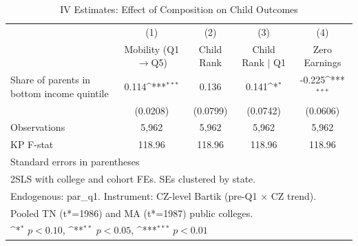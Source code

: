 \begin{table}[htbp]\centering
\def\sym#1{\ifmmode^{#1}\else\(^{#1}\)\fi}
\caption{IV Estimates: Effect of Composition on Child Outcomes}
\label{tab:iv_second_stage}
\begin{tabular}{l*{4}{c}}
\toprule
                    &\multicolumn{1}{c}{(1)}&\multicolumn{1}{c}{(2)}&\multicolumn{1}{c}{(3)}&\multicolumn{1}{c}{(4)}\\
                    &\multicolumn{1}{c}{Mobility (Q1$\to$Q5)}&\multicolumn{1}{c}{Child Rank}&\multicolumn{1}{c}{Child Rank $\mid$ Q1}&\multicolumn{1}{c}{Zero Earnings}\\
\midrule
Share of parents in bottom income quintile&       0.114\sym{***}&       0.136         &       0.141\sym{*}  &      -0.225\sym{***}\\
                    &    (0.0208)         &    (0.0799)         &    (0.0742)         &    (0.0606)         \\
\midrule
Observations        &       5,962         &       5,962         &       5,962         &       5,962         \\
KP F-stat           &      118.96         &      118.96         &      118.96         &      118.96         \\
\bottomrule
\multicolumn{5}{l}{\footnotesize Standard errors in parentheses}\\
\multicolumn{5}{l}{\footnotesize 2SLS with college and cohort FEs. SEs clustered by state.}\\
\multicolumn{5}{l}{\footnotesize Endogenous: par\_q1. Instrument: CZ-level Bartik (pre-Q1 $\times$ CZ trend).}\\
\multicolumn{5}{l}{\footnotesize Pooled TN (t*=1986) and MA (t*=1987) public colleges.}\\
\multicolumn{5}{l}{\footnotesize \sym{*} \(p<0.10\), \sym{**} \(p<0.05\), \sym{***} \(p<0.01\)}\\
\end{tabular}
\end{table}
